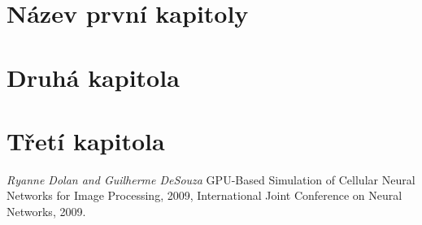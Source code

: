 \documentclass{vskpou} %
\begin{document}
\section{Název první kapitoly}




\section{Druhá kapitola}



\section{Třetí kapitola}



\stranyresume

\begin{thebibliography}{9}

\textit{Ryanne Dolan and Guilherme DeSouza} GPU-Based Simulation of Cellular Neural Networks
for Image Processing, 2009, International Joint Conference on Neural Networks, 2009.



\begin{comment}
Examples


 
\bibitem{Hruby-Kubat} Hrubý,~D., Kubát,~J. \textit{Matematika pro gymnázia: Diferenciální a integrální počet.} 1.\,vydání. Praha: Prometheus, 1997. \ISBN{80-7196-063-2}. Kapitola~6, Určitý integrál, s.\,150--178.

\bibitem{Knuth} Knuth,~D.~E. \textit{The \TeX book.} Reading, Massachusetts: Addison-Wesley, 1984. \ISBN{0-201-13447-0}.

\bibitem{fancy} Moravec, David. Balíček \texttt{fancyhdr.sty}. \textit{Zpravodaj Československého sdružení uživatelů \TeX u} [online]. 2001, roč.\,11, č.\,4, s.\,186--195. \ISSN{1211-6661}. Dostupné z~\url{http://bulletin.cstug.cz/pdf/}.

\bibitem{Mandelbrot} Wikipedia contributors. \textit{Mandelbrot Set} [online]. Wikipedia: The Free Encyclopedia, c2009, datum poslední revize 22.\,10.\,2009 [citováno 22.\,10.\,2009].
\url{http://en.wikipedia.org/wiki/Mandelbrot_set}.

\bibitem{TeX} Přispěvatelé wikipedie. \textit{\TeX} [online]. Wikipedie: Otevřená encyklopedie, c2009, datum poslední revize 7.\,10.\,2009 [citováno 22.\,10.\,2009].
\url{http://cs.wikipedia.org/wiki/TeX}.
\end{comment}
\end{thebibliography}
\end{document}

